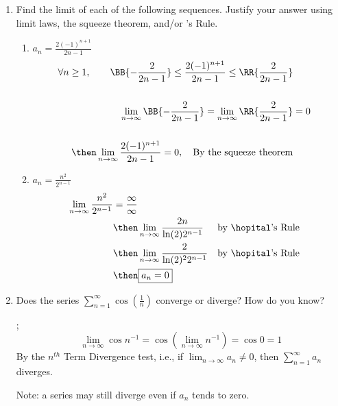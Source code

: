 \documentclass{nosvagor-notes}
\begin{document}
\begin{enumerate}
  \item Find the limit of each of the following sequences. Justify your answer
    using limit laws, the squeeze theorem, and/or \hopital's Rule.
    \begin{enumerate}
      \item \(\displaystyle a_n = \frac{2(-1)^{n+1}}{2n-1}\)
      \begin{align*}
        \forall n \geq 1,
        \qquad \BB{-\frac{2}{2n-1}} \leq
        \frac{2(-1)^{n+1}}{2n-1} \leq
        \RR{\frac{2}{2n-1}} \\\\
        \lim_{n \to \infty} \BB{-\frac{2}{2n-1}} =
        \lim_{n \to \infty} \RR{\frac{2}{2n-1}} &= 0 \\\\
        \then \lim_{n \to \infty} \frac{2(-1)^{n+1}}{2n-1} = 0, \quad \text{By the squeeze theorem} \\
      \end{align*}

    \vspace{90pt}
      \item \(\displaystyle a_n = \frac{n^2}{2^{n-1}}\)
        \begin{align*}
          \lim_{n \to \infty} \frac{n^2}{2^{n-1}} &= \frac{\infty}{\infty} \\
          &\then \lim_{n \to \infty} \frac{2n}{\ln(2)2^{n-1}}
          && \text{by \hopital's Rule} \\
          &\then \lim_{n \to \infty} \frac{2}{\ln(2)^2 2^{n-1}}
          && \text{by \hopital's Rule} \\
          &\then \boxed{a_n = 0}
        \end{align*}
    \end{enumerate}

  \newpage

  \item Does the series \(\displaystyle \sum_{n=1}^{\infty} \cos \left(
    \frac{1}{n} \right) \) converge or diverge? How do you know?

    ;
    \[%
      \lim_{n \to \infty} \cos n^{-1} = \cos \left(\lim_{n \to \infty} n^{-1}\right) = \cos 0 = 1
    \]%
    By the \(n^{th}\) Term Divergence test, i.e., if \(\lim_{n \to \infty} a_n
    \neq 0\), then \(\sum_{n=1}^{\infty} a_n\) diverges.

    Note: a series may still diverge even if \(a_n\) tends to zero.
    \vspace{80pt}


\end{enumerate}
\end{document}
